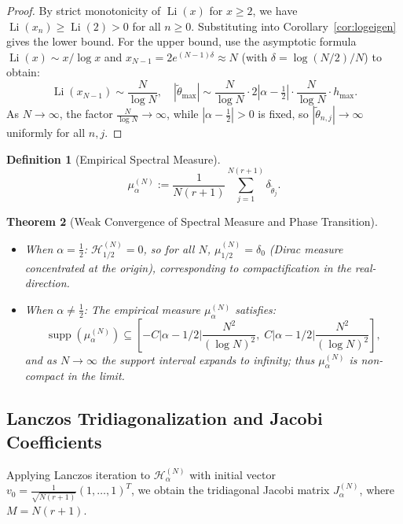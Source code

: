 \documentclass[12pt,a4paper]{amsart}
\theoremstyle{plain}
\newtheorem{theorem}{Theorem}[section]
\theoremstyle{definition}
\newtheorem{definition}[theorem]{Definition}
\theoremstyle{remark}
\begin{document}
\begin{proof}
By strict monotonicity of $\operatorname{Li}(x)$ for $x\geq 2$, we have $\operatorname{Li}(x_n)\geq\operatorname{Li}(2)>0$ for all $n\geq 0$. Substituting into Corollary~\ref{cor:logeigen} gives the lower bound. For the upper bound, use the asymptotic formula $\operatorname{Li}(x)\sim x/\log x$ and $x_{N-1}=2e^{(N-1)\delta}\approx N$ (with $\delta=\log(N/2)/N$) to obtain:
\[
\operatorname{Li}(x_{N-1})\sim\frac{N}{\log N},\quad |\tilde{\theta}_{\max}|\sim\frac{N}{\log N}\cdot 2|\alpha-\tfrac12|\cdot\frac{N}{\log N}\cdot h_{\max}.
\]
As $N\to\infty$, the factor $\frac{N}{\log N}\to\infty$, while $|\alpha-\frac12|>0$ is fixed, so $|\tilde{\theta}_{n,j}|\to\infty$ uniformly for all $n,j$.
\end{proof}

\begin{definition}[Empirical Spectral Measure]\label{def:esm}
\[
\mu_\alpha^{(N)} := \frac{1}{N(r+1)} \sum_{j=1}^{N(r+1)} \delta_{\tilde{\theta}_j}.
\]
\end{definition}

\begin{theorem}[Weak Convergence of Spectral Measure and Phase Transition]\label{thm:spectralmeasure}
\begin{itemize}
\item When $\alpha = \frac{1}{2}$: $\mathcal{H}_{1/2}^{(N)} = 0$, so for all $N$, $\mu_{1/2}^{(N)} = \delta_0$ (Dirac measure concentrated at the origin), corresponding to compactification in the real-direction.
\item When $\alpha \neq \frac{1}{2}$: The empirical measure $\mu_\alpha^{(N)}$ satisfies:
\[
\operatorname{supp}(\mu_\alpha^{(N)}) \subseteq \left[-C|\alpha-1/2|\frac{N^2}{(\log N)^2},\; C|\alpha-1/2|\frac{N^2}{(\log N)^2}\right],
\]
and as $N \to \infty$ the support interval expands to infinity; thus $\mu_\alpha^{(N)}$ is non-compact in the limit.
\end{itemize}
\end{theorem}

\subsection{Lanczos Tridiagonalization and Jacobi Coefficients}

Applying Lanczos iteration to $\mathcal{H}_\alpha^{(N)}$ with initial vector $v_0 = \frac{1}{\sqrt{N(r+1)}}(1,\dots,1)^T$, we obtain the tridiagonal Jacobi matrix $J_\alpha^{(N)}$, where $M = N(r+1)$.
\end{document}

